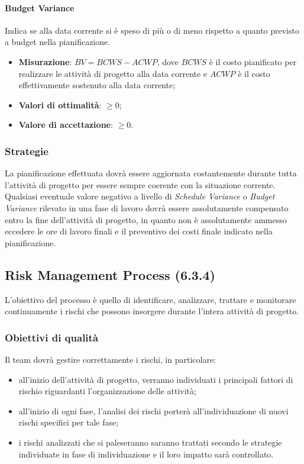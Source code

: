 \paragraph{Budget Variance}
\label{budgetVariance}
Indica se alla data corrente si è speso di più o di meno rispetto a quanto previsto a budget nella pianificazione.
\begin{itemize}
\item \textbf{Misurazione}: $BV = BCWS - ACWP$, dove $BCWS$ è il costo pianificato per realizzare le attività di progetto alla data corrente e $ACWP$ è il costo effettivamente sostenuto alla data corrente;
\item \textbf{Valori di ottimalità}: $\geq 0$;
\item \textbf{Valore di accettazione}: $\geq 0$.
\end{itemize}
\subsubsection{Strategie}
La pianificazione effettuata dovrà essere aggiornata costantemente durante tutta l'attività di progetto per essere sempre coerente con la situazione corrente.\\
Qualsiasi eventuale valore negativo a livello di \textit{Schedule Variance} o  \textit{Budget Variance} rilevato in una fase di lavoro dovrà essere assolutamente compensato entro la fine dell'attività di progetto, in quanto non è assolutamente ammesso eccedere le ore di lavoro finali e il preventivo dei costi finale indicato nella pianificazione.
\subsection{Risk Management Process (6.3.4)}
\label{riskMgmt}
L'obiettivo del processo è quello di identificare, analizzare, trattare e monitorare continuamente i rischi che possono insorgere durante l'intera attività di progetto.
\subsubsection{Obiettivi di qualità}
Il team dovrà gestire correttamente i rischi, in particolare:
\begin{itemize}
\item all'inizio dell'attività di progetto, verranno individuati i principali fattori di rischio riguardanti l'organizzazione delle attività;
\item all'inizio di ogni fase, l'analisi dei rischi porterà all'individuazione di nuovi rischi specifici per tale fase;
\item i rischi analizzati che si paleseranno saranno trattati secondo le strategie individuate in fase di individuazione e il loro impatto sarà controllato.
\end{itemize}
